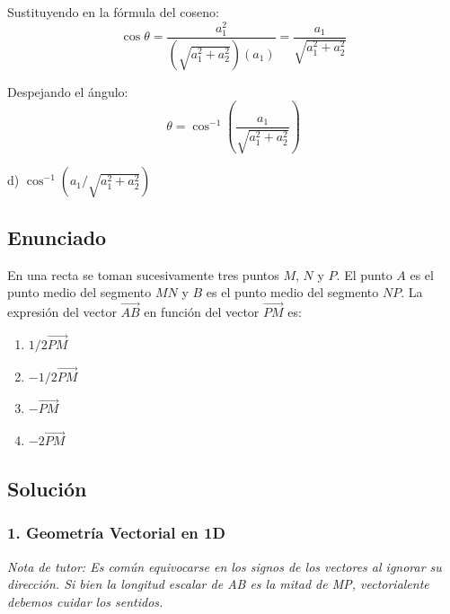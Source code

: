 \documentclass[12pt, a4paper]{article}
\begin{document}
Sustituyendo en la fórmula del coseno:
$$ \cos \theta = \frac{a_1^2}{(\sqrt{a_1^2 + a_2^2}) (a_1)} = \frac{a_1}{\sqrt{a_1^2 + a_2^2}} $$

Despejando el ángulo:
$$ \theta = \cos^{-1} \left( \frac{a_1}{\sqrt{a_1^2 + a_2^2}} \right) $$

\begin{tcolorbox}[colback=green!5!white, colframe=green!50!black, title=Respuesta Final]
\centering \Large d) $\cos^{-1}(a_1 / \sqrt{a_1^2 + a_2^2})$
\end{tcolorbox}

\newpage


\subsection*{Enunciado}
En una recta se toman sucesivamente tres puntos $M$, $N$ y $P$. El punto $A$ es el punto medio del segmento $MN$ y $B$ es el punto medio del segmento $NP$. La expresión del vector $\vec{AB}$ en función del vector $\vec{PM}$ es:
\begin{enumerate}[label=\alph*)]
    \item $1/2 \vec{PM}$
    \item $-1/2 \vec{PM}$
    \item $-\vec{PM}$
    \item $-2 \vec{PM}$
\end{enumerate}

\subsection*{Solución}

\subsubsection*{1. Geometría Vectorial en 1D}
\textit{Nota de tutor: Es común equivocarse en los signos de los vectores al ignorar su dirección. Si bien la longitud escalar de AB es la mitad de MP, vectorialente debemos cuidar los sentidos.}
\end{document}
